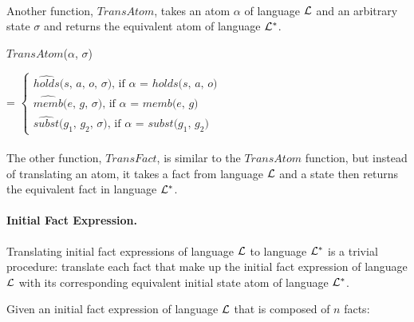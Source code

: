 \documentclass[11pt, twocolumn]{article}
\newenvironment{vquote}
  {\begin{list}{}{\leftmargin 1em}\item[]}
  {\end{list}}
\begin{document}
        \paragraph{}

          Another function, $TransAtom$, takes an atom $\alpha$ of language
          ${\cal L}$ and an arbitrary state $\sigma$ and returns the equivalent
          atom of language ${\cal L}^{*}$.

          \begin{vquote}
            $TransAtom$($\alpha$, $\sigma$)

            =
            \begin{math}
              \begin{cases}
                \mbox{$\hat{holds}$($s$, $a$, $o$, $\sigma$), if $\alpha$ = $holds$($s$, $a$, $o$)} \\
                \mbox{$\hat{memb}$($e$, $g$, $\sigma$), if $\alpha$ = $memb$($e$, $g$)} \\
                \mbox{$\hat{subst}$($g_{1}$, $g_{2}$, $\sigma$), if $\alpha$ = $subst$($g_{1}$, $g_{2}$)}
              \end{cases}
            \end{math}
          \end{vquote}

        \paragraph{}

          The other function, $TransFact$, is similar to the $TransAtom$
          function, but instead of translating an atom, it takes a fact
          from language ${\cal L}$ and a state then returns the equivalent
          fact in language ${\cal L}^{*}$.

        \paragraph{Initial Fact Expression.}

          Translating initial fact expressions of language ${\cal L}$ to
          language ${\cal L}^{*}$ is a trivial procedure: translate each fact
          that make up the initial fact expression of language ${\cal L}$
          with its corresponding equivalent initial state atom of language
          ${\cal L}^{*}$.

          Given an initial fact expression of language ${\cal L}$ that is
          composed of $n$ facts:
\end{document}
